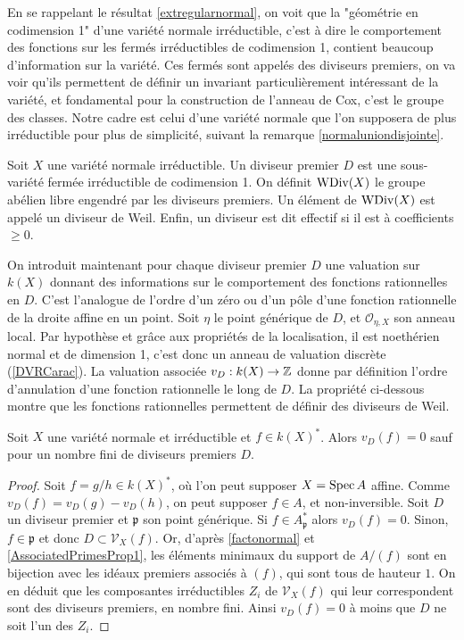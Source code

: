 En se rappelant le résultat \ref{extregularnormal}, on voit que la "géométrie en codimension 1" d'une variété normale irréductible, c'est à dire le comportement des fonctions sur les fermés irréductibles de codimension 1, contient beaucoup d'information sur la variété. Ces fermés sont appelés des diviseurs premiers, on va voir qu'ils permettent de définir un invariant particulièrement intéressant de la variété, et fondamental pour la construction de l'anneau de Cox, c'est le groupe des classes. Notre cadre est celui d'une variété normale que l'on supposera de plus irréductible pour plus de simplicité, suivant la remarque \ref{normaluniondisjointe}.

\begin{defn}
Soit $X$ une variété normale irréductible. Un diviseur premier $D$ est une sous-variété fermée irréductible de codimension 1. On définit $\operatorname{WDiv}(X)$ le groupe abélien libre engendré par les diviseurs premiers. Un élément de $\operatorname{WDiv}(X)$ est appelé un diviseur de Weil. Enfin, un diviseur est dit effectif si il est à coefficients $\geq 0$. 
\end{defn}
On introduit maintenant pour chaque diviseur premier $D$ une valuation sur $k(X)$ donnant des informations sur le comportement des fonctions rationnelles en $D$. C'est l'analogue de l'ordre d'un zéro ou d'un pôle d'une fonction rationnelle de la droite affine en un point. Soit $\eta$ le point générique de $D$, et $\mathcal{O}_{\eta,X}$ son anneau local. Par hypothèse et grâce aux propriétés de la localisation, il est noethérien normal et de dimension 1, c'est donc un anneau de valuation discrète (\ref{DVRCarac}). La valuation associée $v_D:k(X)\rightarrow \mathbb{Z}$ donne par définition l'ordre d'annulation d'une fonction rationnelle le long de $D$. La propriété ci-dessous montre que les fonctions rationnelles permettent de définir des diviseurs de Weil.

\begin{prop}\label{noetherienPWDivBienDef}
Soit $X$ une variété normale et irréductible et $f\in k(X)^*$. Alors $v_D(f)=0$ sauf pour un nombre fini de diviseurs premiers $D$.
\end{prop}
\begin{proof}
Soit $f=g/h\in k(X)^*$, où l'on peut supposer $X=\operatorname{Spec} A$ affine. Comme $v_D(f)=v_D(g)-v_D(h)$, on peut supposer $f\in A$, et non-inversible. Soit $D$ un diviseur premier et $\mathfrak{p}$ son point générique. Si $f\in A_\mathfrak{p}^*$ alors $v_D(f)=0$. Sinon, $f\in \mathfrak{p}$ et donc $D \subset \mathcal{V}_X(f)$. Or, d'après \ref{factonormal} et \ref{AssociatedPrimesProp1}, les éléments minimaux du support de $A/(f)$ sont en bijection avec les idéaux premiers associés à $(f)$, qui sont tous de hauteur $1$. On en déduit que les composantes irréductibles $Z_i$ de $\mathcal{V}_X(f)$ qui leur correspondent sont des diviseurs premiers, en nombre fini. Ainsi $v_D(f)=0$ à moins que $D$ ne soit l'un des $Z_i$.
\end{proof}

